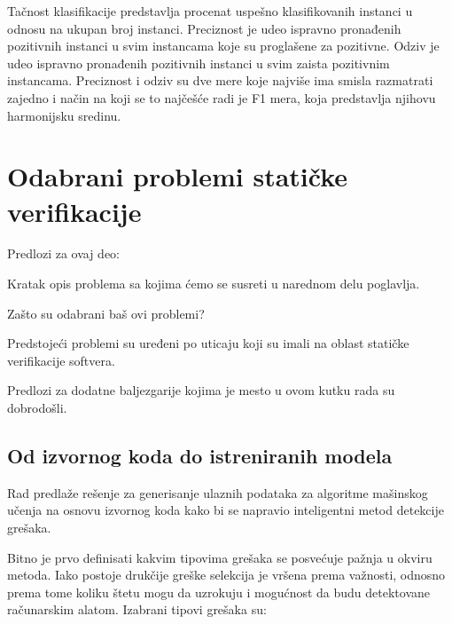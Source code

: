 \documentclass[a4paper]{article}
\begin{document}
Tačnost klasifikacije predstavlja procenat uspešno klasifikovanih instanci u odnosu 
na ukupan broj instanci. Preciznost je udeo ispravno pronađenih pozitivnih instanci 
u svim instancama koje su proglašene za pozitivne. Odziv je udeo ispravno pronađenih 
pozitivnih instanci u svim zaista pozitivnim instancama. Preciznost i odziv su dve 
mere koje najviše ima smisla razmatrati zajedno i način na koji se to najčešće radi 
je F1 mera, koja predstavlja njihovu harmonijsku sredinu.



\section{Odabrani problemi statičke verifikacije}
\label{sec:naslovN}



Predlozi za ovaj deo:

Kratak opis problema sa kojima ćemo se susreti u narednom delu poglavlja. 

Zašto su odabrani baš ovi problemi?

Predstojeći problemi su uređeni po uticaju koji su imali na oblast statičke verifikacije softvera.

Predlozi za dodatne baljezgarije kojima je mesto u ovom kutku rada su dobrodošli.


\subsection{Od izvornog koda do istreniranih modela}
\label{subsec:pregled}

Rad \cite{staticFeatures} predlaže rešenje za generisanje ulaznih podataka za algoritme mašinskog učenja na osnovu
izvornog koda kako bi se napravio inteligentni metod detekcije grešaka.

Bitno je prvo definisati kakvim tipovima grešaka se posvećuje pažnja u okviru metoda.
Iako postoje drukčije greške selekcija je vršena prema važnosti, odnosno prema tome
koliku štetu mogu da uzrokuju i mogućnost da budu detektovane računarskim alatom. Izabrani tipovi grešaka su:
\end{document}
